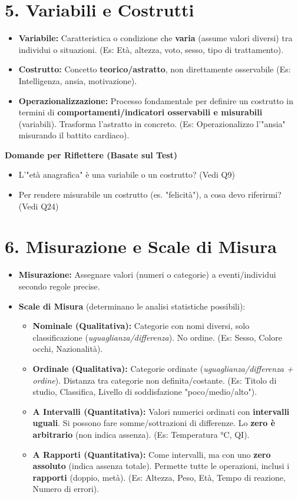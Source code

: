 \documentclass[12pt, a4paper]{article}
\newenvironment{reflectionbox}{%
    \begin{framed}\par\medskip\noindent
    \textbf{\color{boxtitlecolor}Domande per Riflettere (Basate sul Test)} \par
    \begin{itemize}[leftmargin=*, label=$\blacktriangleright$]
}{%
    \end{itemize}\par\medskip
    \end{framed}
}
\begin{document}
\section*{5. Variabili e Costrutti}
\begin{itemize}
    \item \textbf{Variabile:} Caratteristica o condizione che \textbf{varia} (assume valori diversi) tra individui o situazioni. (Es: Età, altezza, voto, sesso, tipo di trattamento).
    \item \textbf{Costrutto:} Concetto \textbf{teorico/astratto}, non direttamente osservabile (Es: Intelligenza, ansia, motivazione).
    \item \textbf{Operazionalizzazione:} Processo fondamentale per definire un costrutto in termini di \textbf{comportamenti/indicatori osservabili e misurabili} (variabili). Trasforma l'astratto in concreto. (Es: Operazionalizzo l'"ansia" misurando il battito cardiaco).
\end{itemize}

\begin{reflectionbox}
    \item L'"età anagrafica" è una variabile o un costrutto? (Vedi Q9)
    \item Per rendere misurabile un costrutto (es. "felicità"), a cosa devo riferirmi? (Vedi Q24)
\end{reflectionbox}

\section*{6. Misurazione e Scale di Misura}
\begin{itemize}
    \item \textbf{Misurazione:} Assegnare valori (numeri o categorie) a eventi/individui secondo regole precise.
    \item \textbf{Scale di Misura} (determinano le analisi statistiche possibili):
        \begin{itemize}
            \item \textbf{Nominale (Qualitativa):} Categorie con nomi diversi, solo classificazione (\textit{uguaglianza/differenza}). No ordine. (Es: Sesso, Colore occhi, Nazionalità).
            \item \textbf{Ordinale (Qualitativa):} Categorie ordinate (\textit{uguaglianza/differenza + ordine}). Distanza tra categorie non definita/costante. (Es: Titolo di studio, Classifica, Livello di soddisfazione "poco/medio/alto").
            \item \textbf{A Intervalli (Quantitativa):} Valori numerici ordinati con \textbf{intervalli uguali}. Si possono fare somme/sottrazioni di differenze. Lo \textbf{zero è arbitrario} (non indica assenza). (Es: Temperatura °C, QI).
            \item \textbf{A Rapporti (Quantitativa):} Come intervalli, ma con uno \textbf{zero assoluto} (indica assenza totale). Permette tutte le operazioni, inclusi i \textbf{rapporti} (doppio, metà). (Es: Altezza, Peso, Età, Tempo di reazione, Numero di errori).
        \end{itemize}
\end{itemize}
\end{document}
